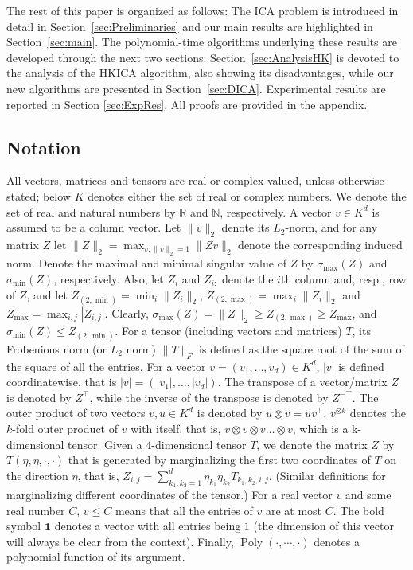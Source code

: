 \documentclass{article}
\newcommand{\real}{\mathbb{R}}
\renewcommand{\natural}{\mathbb{N}}
\DeclareMathOperator{\pol}{Poly}
\newcommand{\poly}[1]{\pol\left(#1\right)}
\theoremstyle{definition}
\begin{document}
The rest of this paper is organized as follows: 
The ICA problem is introduced in detail in Section~\ref{sec:Preliminaries} and  our main results are highlighted in Section~\ref{sec:main}.
The polynomial-time algorithms underlying these results are developed through the next two sections: Section~\ref{sec:AnalysisHK} is devoted to the analysis of the HKICA algorithm, also showing its disadvantages, while our new algorithms are presented in Section~\ref{sec:DICA}.
Experimental results are reported in Section \ref{sec:ExpRes}.
All proofs are provided in the appendix.

\subsection{Notation}
All vectors, matrices and tensors are real or complex valued, unless otherwise stated; below $K$ denotes either the set of real or complex numbers. We denote the set of real and natural numbers by $\real$ and $\natural$, respectively.
A vector $v \in K^d$ is assumed to be a column vector.
Let $\|v\|_2$ denote its $L_2$-norm, and for any matrix $Z$ let $\|Z\|_2=\max_{v:\|v\|_2=1}{\|Z v\|_2}$ denote the corresponding induced norm. Denote the maximal and minimal singular value of $Z$ by $\sigma_{\max}(Z)$ and  $\sigma_{\min}(Z)$, respectively. Also, let $Z_i$ and $Z_{i:}$ denote the $i$th column and, resp., row of $Z$, and let $Z_{(2,\min)} = \min_{i} \|Z_i\|_2$, $Z_{(2,\max)} = \max_{i} \|Z_i\|_2$ and $Z_{\max} = \max_{i,j} |Z_{i,j}|$. 
Clearly, $\sigma_{\max}(Z) =\|Z\|_2 \ge Z_{(2,\max)} \ge Z_{\max}$, and $\sigma_{\min}(Z) \le Z_{(2,\min)}$. For a tensor (including vectors and matrices) $T$, its Frobenious norm (or $L_2$ norm) $\|T\|_F$  is defined as the square root of the sum of the square of all the entries.  
For a vector $v=(v_1,\ldots,v_d) \in K^d$, $\vert v \vert$ is defined coordinatewise, that is $\vert v \vert=(\vert v_1 \vert,\ldots,\vert v_d\vert)$. 
The transpose of a vector/matrix $Z$ is denoted by $Z^\top$, while the inverse of the transpose is denoted by $Z^{-\top}$.  
The outer product of two vectors $v, u \in K^d$ is denoted by $u\otimes v=u v^\top$. 
$v^{\otimes k}$ denotes the $k$-fold outer product of $v$ with itself, that is, $v\otimes v\otimes v \ldots \otimes v$, which is a k-dimensional tensor.
Given a $4$-dimensional tensor $T$, we denote the matrix $Z$ by $T(\eta,\eta,\cdot , \cdot)$ that is generated by marginalizing the first two coordinates of $T$ on the direction $\eta$, that is,
$Z_{i,j} = \sum_{k_1,k_2 = 1}^{d} \eta_{k_1} \eta_{k_2} T_{k_1,k_2,i,j}$. (Similar definitions for marginalizing different coordinates of the tensor.)
For a real vector $v$ and some real number $C$, $v \le C$ means that all the entries of $v$ are at most $C$. 
The bold symbol $\boldsymbol{1}$ denotes a vector with all entries being $1$ (the dimension of this vector will always be clear from the context).
Finally, $\poly{\cdot,\cdots,\cdot}$ denotes a polynomial function of its argument.
\end{document}
